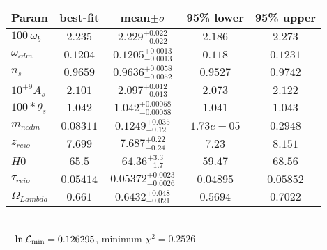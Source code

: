 \begin{tabular}{|l|c|c|c|c|} 
 \hline 
Param & best-fit & mean$\pm\sigma$ & 95\% lower & 95\% upper \\ \hline 
$100~\omega{}_{b }$ &$2.235$ & $2.229_{-0.022}^{+0.022}$ & $2.186$ & $2.273$ \\ 
$\omega{}_{cdm }$ &$0.1204$ & $0.1205_{-0.0013}^{+0.0013}$ & $0.118$ & $0.1231$ \\ 
$n_{s }$ &$0.9659$ & $0.9636_{-0.0052}^{+0.0058}$ & $0.9527$ & $0.9742$ \\ 
$10^{+9}A_{s }$ &$2.101$ & $2.097_{-0.013}^{+0.012}$ & $2.073$ & $2.122$ \\ 
$100*\theta{}_{s }$ &$1.042$ & $1.042_{-0.00058}^{+0.00058}$ & $1.041$ & $1.043$ \\ 
$m_{ncdm }$ &$0.08311$ & $0.1249_{-0.12}^{+0.035}$ & $1.73e-05$ & $0.2948$ \\ 
$z_{reio }$ &$7.699$ & $7.687_{-0.24}^{+0.22}$ & $7.23$ & $8.151$ \\ 
$H0$ &$65.5$ & $64.36_{-1.7}^{+3.3}$ & $59.47$ & $68.56$ \\ 
$\tau{}_{reio }$ &$0.05414$ & $0.05372_{-0.0026}^{+0.0023}$ & $0.04895$ & $0.05852$ \\ 
$\Omega{}_{Lambda }$ &$0.661$ & $0.6432_{-0.021}^{+0.048}$ & $0.5694$ & $0.7022$ \\ 
\hline 
 \end{tabular} \\ 
$-\ln{\cal L}_\mathrm{min} =0.126295$, minimum $\chi^2=0.2526$ \\ 
